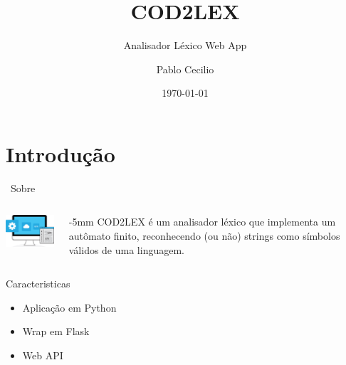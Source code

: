 \documentclass{beamer}
\title{COD2LEX}
\subtitle{Analisador Léxico Web App}
\author{Pablo Cecilio}
\date{\today}
\begin{document}
\begin{frame}
    \titlepage 
\end{frame}

\section{Introdução}
\begin{frame}{\raisebox{-0.2\height}{}~Sobre}

    \begin{columns}[onlytextwidth,T]
    \begin{column}{40mm}
        \includegraphics[width=4cm]{img/webapp.png}
    \end{column}
    \begin{column}{\dimexpr\linewidth-40mm-5mm}
        COD2LEX é um analisador léxico que implementa um autômato finito, reconhecendo (ou não) strings como símbolos válidos de uma linguagem.
    \end{column}
    \end{columns}

    \vspace{5mm}
    \begin{block}{Caracteristicas}
        \begin{itemize}
        \item Aplicação em Python
        \item Wrap em Flask
        \item Web API
        \end{itemize}
    \end{block}

\end{frame}
\end{document}
